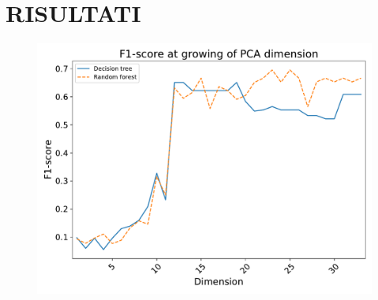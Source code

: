 \section{RISULTATI}\begin{figure}
	\centering
	\includegraphics[width=0.8\linewidth]{images/pca-perf}
	\caption{}
	\label{fig:pca-perf}
\end{figure}
